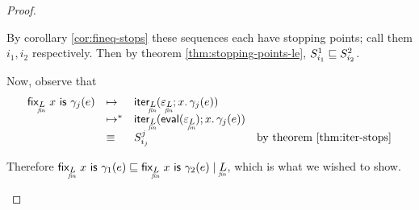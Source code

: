 \documentclass{article}
\begin{document}
\begin{proof}
\begin{description}
    By corollary \ref{cor:fineq-stops} these sequences each have stopping
    points; call them $i_1, i_2$ respectively. Then by theorem
    \ref{thm:stopping-points-le}, $S^1_{i_1} \sqsubseteq S^2_{i_2}$.

    Now, observe that
    \[\begin{array}{rlll}
      \tfix{\fineq{L}}{x}{\gamma_j(e)}
      &\step& \iter{\fineq{L}}{\unit_{\fineq{L}}}{x}{\gamma_j(e)}\\
      &\steps& \iter{\fineq{L}}{\evalfn(\unit_{\fineq{L}})}{x}{\gamma_j(e)}\\
      &\equiv& S_{i_j}^j & \text{by theorem \ref{thm:iter-stops}}
    \end{array}\]

    Therefore $\lr{\fineq{L}}{\tfix{\fineq{L}}{x}{\gamma_1(e)} \ale
      \tfix{\fineq{L}}{x}{\gamma_2(e)}}$, which is what we wished to show.
  \end{description}
\end{proof}
\end{document}
